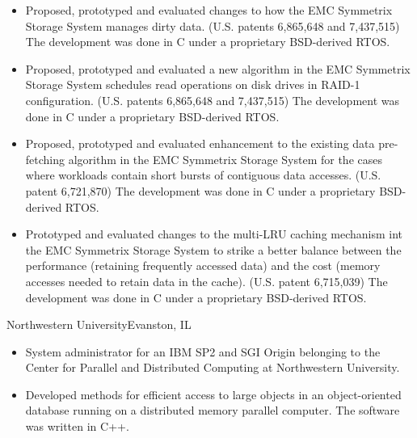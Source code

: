 {
	\begin{itemize}
		\item Proposed, prototyped and evaluated changes to how the EMC Symmetrix Storage System manages dirty data.
			(U.S. patents 6,865,648 and 7,437,515) The development was done in
			C under a proprietary BSD-derived RTOS.
		\item Proposed, prototyped and evaluated a new algorithm in the EMC Symmetrix Storage System schedules read
			operations on disk drives in RAID-1 configuration. (U.S. patents
			6,865,648 and 7,437,515) The development was done in C under a
			proprietary BSD-derived RTOS.
		\item Proposed, prototyped and evaluated enhancement to the existing data pre-fetching algorithm
			in the EMC Symmetrix Storage System for the cases where workloads contain short bursts of 
			contiguous data accesses. (U.S. patent 6,721,870) The development
			was done in C under a proprietary BSD-derived RTOS.
		\item Prototyped and evaluated changes to the multi-LRU caching mechanism int the EMC Symmetrix Storage
			System to strike a better balance between the performance (retaining frequently accessed data) and the cost
			(memory accesses needed to retain data in the cache).
			(U.S. patent 6,715,039) The development was done in C under a
			proprietary BSD-derived RTOS.
	\end{itemize}
}
{Northwestern University}{Evanston, IL}
{\begin{itemize}
	\item System administrator for an IBM SP2 and SGI Origin belonging to the 
		Center for Parallel and Distributed Computing at Northwestern University.
	\item Developed methods for efficient access to large objects in an object-oriented
		database running on a distributed memory parallel computer. The
		software was written in C++.
	\end{itemize}}
